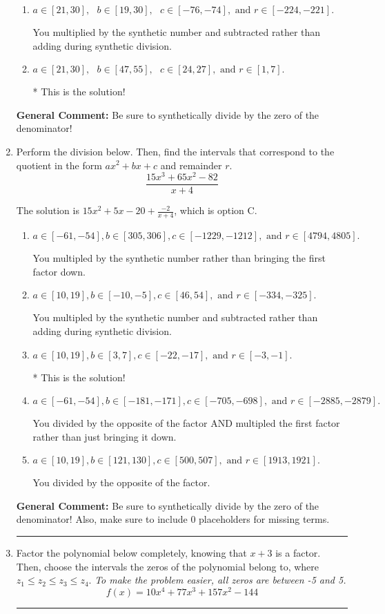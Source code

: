 \documentclass{extbook}[14pt]
\newcommand{\litem}[1]{\item #1

\rule{\textwidth}{0.4pt}}
\begin{document}
\begin{enumerate}
{\begin{enumerate}[label=\Alph*.]
 You multiplied by the synthetic number rather than bringing the first factor down.
\item \( a \in [21, 30], \text{   } b \in [19, 30], \text{   } c \in [-76, -74], \text{   and   } r \in [-224, -221]. \)

 You multiplied by the synthetic number and subtracted rather than adding during synthetic division.
\item \( a \in [21, 30], \text{   } b \in [47, 55], \text{   } c \in [24, 27], \text{   and   } r \in [1, 7]. \)

* This is the solution!
\end{enumerate}

\textbf{General Comment:} Be sure to synthetically divide by the zero of the denominator!
}
\litem{
Perform the division below. Then, find the intervals that correspond to the quotient in the form $ax^2+bx+c$ and remainder $r$.
\[ \frac{15x^{3} +65 x^{2} -82}{x + 4} \]

The solution is \( 15x^{2} +5 x -20 + \frac{-2}{x + 4} \), which is option C.\begin{enumerate}[label=\Alph*.]
\item \( a \in [-61, -54], b \in [305, 306], c \in [-1229, -1212], \text{ and } r \in [4794, 4805]. \)

 You multipled by the synthetic number rather than bringing the first factor down.
\item \( a \in [10, 19], b \in [-10, -5], c \in [46, 54], \text{ and } r \in [-334, -325]. \)

 You multipled by the synthetic number and subtracted rather than adding during synthetic division.
\item \( a \in [10, 19], b \in [3, 7], c \in [-22, -17], \text{ and } r \in [-3, -1]. \)

* This is the solution!
\item \( a \in [-61, -54], b \in [-181, -171], c \in [-705, -698], \text{ and } r \in [-2885, -2879]. \)

 You divided by the opposite of the factor AND multipled the first factor rather than just bringing it down.
\item \( a \in [10, 19], b \in [121, 130], c \in [500, 507], \text{ and } r \in [1913, 1921]. \)

 You divided by the opposite of the factor.
\end{enumerate}

\textbf{General Comment:} Be sure to synthetically divide by the zero of the denominator! Also, make sure to include 0 placeholders for missing terms.
}
\litem{
Factor the polynomial below completely, knowing that $x+3$ is a factor. Then, choose the intervals the zeros of the polynomial belong to, where $z_1 \leq z_2 \leq z_3 \leq z_4$. \textit{To make the problem easier, all zeros are between -5 and 5.}
\[ f(x) = 10x^{4} +77 x^{3} +157 x^{2} -144 \]

}
\end{enumerate}
\end{document}

